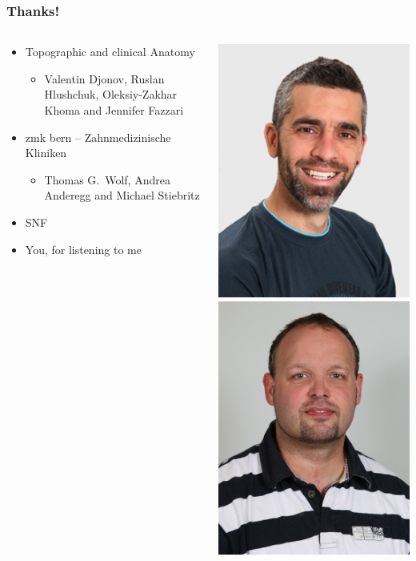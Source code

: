 \documentclass[aspectratio=169]{beamer}
\newcommand{\imheight}{0.8\paperheight}%
\begin{document}
\renewcommand{\imheight}{0.309\paperheight}%
\begin{frame}
	\frametitle{Thanks!}
	\begin{columns}
		\begin{column}{0.5\linewidth}
		\begin{itemize}
			\item Topographic and clinical Anatomy
				\begin{itemize}
					\item Valentin Djonov, Ruslan Hlushchuk, Oleksiy-Zakhar Khoma and Jennifer Fazzari
				\end{itemize}
			\item zmk bern – Zahnmedizinische Kliniken
				\begin{itemize}
					\item Thomas G.\ Wolf, Andrea Anderegg and Michael Stiebritz
				\end{itemize}
			\item SNF
			\item<2-> You, for listening to me
		\end{itemize}
		\end{column}
		\begin{column}{0.5\linewidth}
			\centering
			\includegraphics[height=\imheight]{./images/kopf_dh}%
			\includegraphics[height=\imheight]{./images/kopf_rh}%

\end{column}
\end{columns}
\end{frame}
\end{document}
